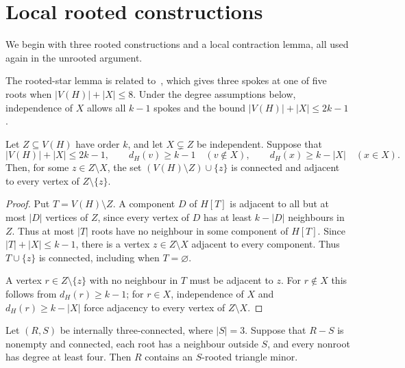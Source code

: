 \section{Local rooted constructions}

We begin with three rooted constructions and a local contraction lemma,
all used again in the unrooted argument.

The rooted-star lemma is related to~\cite[Lemma~4.10]{DNR2026}, which
gives three spokes at one of five roots when $|V(H)|+|X|\le8$.
Under the degree assumptions below, independence of $X$ allows all
$k-1$ spokes and the bound $|V(H)|+|X|\le2k-1$.

\begin{lemma}\label{lem:star}
Let $Z\subseteq V(H)$ have order $k$, and let $X\subsetneq Z$ be
independent. Suppose that
\[
 |V(H)|+|X|\le 2k-1,\qquad
 d_H(v)\ge k-1\quad(v\notin X),\qquad
 d_H(x)\ge k-|X|\quad(x\in X).
\]
Then, for some $z\in Z\setminus X$, the set
$(V(H)\setminus Z)\cup\{z\}$ is connected and adjacent to every vertex
of $Z\setminus\{z\}$.
\end{lemma}

\begin{proof}
Put $T=V(H)\setminus Z$. A component $D$ of $H[T]$ is adjacent to
all but at most $|D|$ vertices of $Z$, since every vertex of $D$ has
at least $k-|D|$ neighbours in $Z$. Thus at most $|T|$ roots have no
neighbour in some component of $H[T]$. Since $|T|+|X|\le k-1$,
there is a vertex
$z\in Z\setminus X$ adjacent to every component. Thus $T\cup\{z\}$
is connected, including when $T=\varnothing$.

A vertex $r\in Z\setminus\{z\}$ with no neighbour in $T$ must
be adjacent to $z$. For $r\notin X$ this follows from $d_H(r)\ge k-1$;
for $r\in X$, independence of $X$ and $d_H(r)\ge k-|X|$ force
adjacency to every vertex of $Z\setminus X$.
\end{proof}

\begin{lemma}\label{lem:triangle}
Let $(R,S)$ be internally three-connected, where $|S|=3$.
Suppose that $R-S$ is nonempty and connected, each root has a neighbour
outside $S$, and every nonroot has degree at least four. Then $R$
contains an $S$-rooted triangle minor.
\end{lemma}

